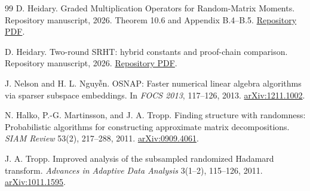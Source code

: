 \documentclass[11pt]{article}
\theoremstyle{definition}\newtheorem{definition}[theorem]{Definition}
\theoremstyle{remark}\newtheorem{remark}[theorem]{Remark}
\newcommand{\1}{\mathbf 1}
\begin{document}
\begin{thebibliography}{99}
D. Heidary. Graded Multiplication Operators for Random-Matrix Moments.
Repository manuscript, 2026. Theorem 10.6 and Appendix B.4--B.5.
\href{https://github.com/DiarHaidary/Results/blob/main/Graded\%20Multiplication\%20Operators\%20for\%20Random-Matrix\%20Moments.pdf}{Repository PDF}.

D. Heidary. Two-round SRHT: hybrid constants and proof-chain comparison.
Repository manuscript, 2026.
\href{https://github.com/DiarHaidary/Results/blob/main/Wick-Hermite\%20Hybrid/srht_hybrid_constants_template.pdf}{Repository PDF}.

J. Nelson and H. L. Nguy\~{\^e}n. OSNAP: Faster numerical linear algebra
algorithms via sparser subspace embeddings. In \emph{FOCS 2013},
117--126, 2013. \href{https://arxiv.org/abs/1211.1002}{arXiv:1211.1002}.

N. Halko, P.-G. Martinsson, and J. A. Tropp.
Finding structure with randomness: Probabilistic algorithms for
constructing approximate matrix decompositions.
\emph{SIAM Review} 53(2), 217--288, 2011.
\href{https://arxiv.org/abs/0909.4061}{arXiv:0909.4061}.

J. A. Tropp. Improved analysis of the subsampled randomized Hadamard
transform. \emph{Advances in Adaptive Data Analysis} 3(1--2), 115--126,
2011. \href{https://arxiv.org/abs/1011.1595}{arXiv:1011.1595}.
\end{thebibliography}
\end{document}
